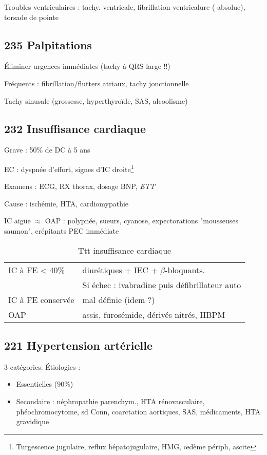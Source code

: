 \documentclass[11pt]{article}
\begin{document}
Troubles ventriculaires : tachy. ventricale, fibrillation ventricalure (\faBomb
absolue), torsade de pointe
\subsection{235 Palpitations}
\label{sec:orgaa3b9d1}
Éliminer urgences immédiates (tachy à QRS large !!)

Fréquents : fibrillation/flutters atriaux, tachy jonctionnelle

Tachy sinusale (grossesse, hyperthyroïde, SAS, alcoolisme) 
\subsection{232 Insuffisance cardiaque}
\label{sec:orgb61b57b}
Grave : 50\% de DC à 5 ans

EC : dyspnée d'effort, signes d'IC droite\footnote{Turgescence jugulaire, reflux hépatojugulaire, HMG, \oe{}dème périph, ascite}

Examens : ECG, RX thorax, dosage BNP, \emph{ETT}

Cause : ischémie, HTA, cardiomypathie

IC aigüe \(\approx\) OAP : polypnée, sueurs, cyanose, expectorations "mousseuses
saumon", crépitants \thus PEC immédiate \faBomb

\begin{table}[htbp]
\caption{Ttt insuffisance cardiaque}
\centering
\begin{tabular}{ll}
IC à FE < 40\% & diurétiques + IEC + \(\beta\)-bloquants\footnotemark.\\
 & Si échec : ivabradine puis défibrillateur auto\\
IC à FE conservée & mal définie (idem ?)\\
OAP & assis, furosémide, dérivés nitrés, HBPM\\
\end{tabular}
\end{table}

\subsection{221 Hypertension artérielle}
\label{sec:orga9db1ce}
3 catégories. Étiologies :
\begin{itemize}
\item Essentielles (90\%)
\item Secondaire : néphropathie parenchym., HTA rénovasculaire, phéochromocytome, sd Conn,
coarctation aortiques, SAS, médicaments, HTA gravidique
\end{itemize}
\end{document}
